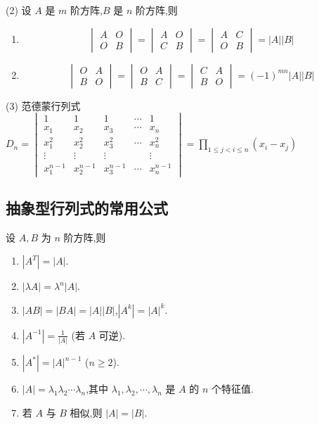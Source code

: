 \documentclass[UTF8]{ctexart}
\theoremstyle{remark}
\begin{document}
	(2) 设 \(A\) 是 \(m\) 阶方阵,\(B\) 是 \(n\) 阶方阵,则
	\begin{enumerate}
		\item 
		\[
		\begin{vmatrix}
			A & O \\
			O & B
		\end{vmatrix}
		=
		\begin{vmatrix}
			A & O \\
			C & B
		\end{vmatrix}
		=
		\begin{vmatrix}
			A & C \\
			O & B
		\end{vmatrix}
		= |A||B|
		\]
		\item 
		\[
		\begin{vmatrix}
			O & A \\
			B & O
		\end{vmatrix}
		=
		\begin{vmatrix}
			O & A \\
			B & C
		\end{vmatrix}
		=
		\begin{vmatrix}
			C & A \\
			B & O
		\end{vmatrix}
		= (-1)^{mn}|A||B|
		\]
	\end{enumerate}
	
	
	(3) 范德蒙行列式 \(D_n = 
	\begin{vmatrix}
		1 & 1 & 1 & \cdots & 1 \\
		x_1 & x_2 & x_3 & \cdots & x_n \\
		x_1^2 & x_2^2 & x_3^2 & \cdots & x_n^2 \\
		\vdots & \vdots & \vdots & & \vdots \\
		x_1^{n - 1} & x_2^{n - 1} & x_3^{n - 1} & \cdots & x_n^{n - 1}
	\end{vmatrix}
	= \prod_{1\leq j < i \leq n} (x_i - x_j)
	\)
	
	\subsection{抽象型行列式的常用公式}
	设 \(A, B\) 为 \(n\) 阶方阵,则
	\begin{enumerate}
		\item \(|A^T| = |A|\).
		\item \(|\lambda A| = \lambda^n|A|\).
		\item \(|AB| = |BA| = |A||B|\),\(|A^k| = |A|^k\).
		\item \(|A^{-1}| = \frac{1}{|A|}\) (若 \(A\) 可逆).
		\item \(|A^*| = |A|^{n - 1}\) (\(n\geq 2\)).
		\item \(|A| = \lambda_1\lambda_2\cdots\lambda_n\),其中 \(\lambda_1, \lambda_2, \cdots, \lambda_n\) 是 \(A\) 的 \(n\) 个特征值.
		\item 若 \(A\) 与 \(B\) 相似,则 \(|A| = |B|\).
	\end{enumerate}
	
\end{document}
